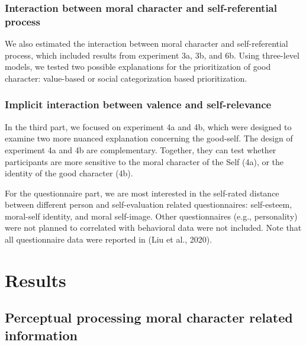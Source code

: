 \documentclass[
  man]{apa6}
\begin{document}
\hypertarget{interaction-between-moral-character-and-self-referential-process}{%
\subsubsection{Interaction between moral character and self-referential process}\label{interaction-between-moral-character-and-self-referential-process}}

We also estimated the interaction between moral character and self-referential process, which included results from experiment 3a, 3b, and 6b. Using three-level models, we tested two possible explanations for the prioritization of good character: value-based or social categorization based prioritization.

\hypertarget{implicit-interaction-between-valence-and-self-relevance}{%
\subsubsection{Implicit interaction between valence and self-relevance}\label{implicit-interaction-between-valence-and-self-relevance}}

In the third part, we focused on experiment 4a and 4b, which were designed to examine two more nuanced explanation concerning the good-self. The design of experiment 4a and 4b are complementary. Together, they can test whether participants are more sensitive to the moral character of the Self (4a), or the identity of the good character (4b).

For the questionnaire part, we are most interested in the self-rated distance between different person and self-evaluation related questionnaires: self-esteem, moral-self identity, and moral self-image. Other questionnaires (e.g., personality) were not planned to correlated with behavioral data were not included. Note that all questionnaire data were reported in (Liu et al., 2020).

\hypertarget{results}{%
\section{Results}\label{results}}

\hypertarget{perceptual-processing-moral-character-related-information}{%
\subsection{Perceptual processing moral character related information}\label{perceptual-processing-moral-character-related-information}}
\end{document}
